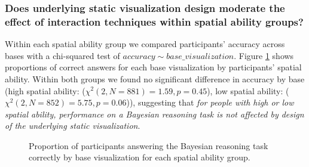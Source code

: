 \subsubsection{Does underlying static visualization design moderate the effect of interaction techniques within spatial ability groups?}

Within each spatial ability group we compared participants' accuracy across bases with a chi-squared test of $accuracy \sim base\_visualization$. Figure \ref{fig:exp2_bases_by_sa} shows proportions of correct answers for each base visualization by participants' spatial ability. Within both groups we found no significant difference in accuracy by base (high spatial ability: ($\chi^2(2, N = 881) = 1.59, p = 0.45$), low spatial ability: ($\chi^2(2, N = 852) = 5.75, p = 0.06$)), suggesting that \textit{for people with high or low spatial ability, performance on a Bayesian reasoning task is not affected by design of the underlying static visualization}. %

\begin{figure}[h]
    \centering
    \caption{Proportion of participants answering the Bayesian reasoning task correctly by base visualization for each spatial ability group.}
    \label{fig:exp2_bases_by_sa}
\end{figure}

